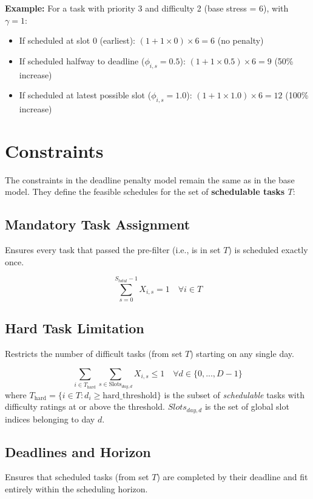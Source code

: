 \documentclass{article}
\begin{document}
\textbf{Example:} For a task with priority 3 and difficulty 2 (base stress = 6), with $\gamma = 1$:
\begin{itemize}
    \item If scheduled at slot 0 (earliest): $(1 + 1 \times 0) \times 6 = 6$ (no penalty)
    \item If scheduled halfway to deadline ($\phi_{i,s} = 0.5$): $(1 + 1 \times 0.5) \times 6 = 9$ (50\% increase)
    \item If scheduled at latest possible slot ($\phi_{i,s} = 1.0$): $(1 + 1 \times 1.0) \times 6 = 12$ (100\% increase)
\end{itemize}

\section{Constraints}

The constraints in the deadline penalty model remain the same as in the base model. They define the feasible schedules for the set of \textbf{schedulable tasks $T$}:

\subsection{Mandatory Task Assignment}
Ensures every task that passed the pre-filter (i.e., is in set $T$) is scheduled exactly once.

\begin{equation}
\sum_{s=0}^{S_{total}-1} X_{i,s} = 1 \quad \forall i \in T \label{eq:task_must_start}
\end{equation}

\subsection{Hard Task Limitation}
Restricts the number of difficult tasks (from set $T$) starting on any single day.

\[
\sum_{i \in T_{\text{hard}}} \sum_{s \in \text{Slots}_{day,d}} X_{i,s} \leq 1 \quad \forall d \in \{0, ..., D-1\}
\]
where $T_{\text{hard}} = \{i \in T : d_i \geq \text{hard\_threshold}\}$ is the subset of \textit{schedulable} tasks with difficulty ratings at or above the threshold. $Slots_{day,d}$ is the set of global slot indices belonging to day $d$.

\subsection{Deadlines and Horizon}
Ensures that scheduled tasks (from set $T$) are completed by their deadline and fit entirely within the scheduling horizon.
\end{document}
